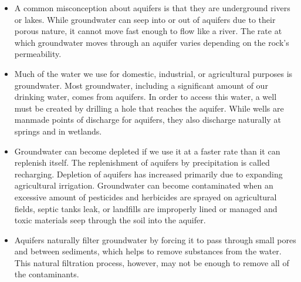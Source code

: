 \begin{enumerate}
\begin{itemize}
\item A common misconception about aquifers is that they are underground rivers or lakes. While groundwater can seep into or out of aquifers due to their porous nature, it cannot move fast enough to flow like a river. The rate at which groundwater moves through an aquifer varies depending on the rock’s permeability.

\item Much of the water we use for domestic, industrial, or agricultural purposes is groundwater. Most groundwater, including a significant amount of our drinking water, comes from aquifers. In order to access this water, a well must be created by drilling a hole that reaches the aquifer. While wells are manmade points of discharge for aquifers, they also discharge naturally at springs and in wetlands.

\item Groundwater can become depleted if we use it at a faster rate than it can replenish itself. The replenishment of aquifers by precipitation is called recharging. Depletion of aquifers has increased primarily due to expanding agricultural irrigation. Groundwater can become contaminated when an excessive amount of pesticides and herbicides are sprayed on agricultural fields, septic tanks leak, or landfills are improperly lined or managed and toxic materials seep through the soil into the aquifer.

\item Aquifers naturally filter groundwater by forcing it to pass through small pores and between sediments, which helps to remove substances from the water. This natural filtration process, however, may not be enough to remove all of the contaminants.


\end{itemize}
\end{enumerate}

